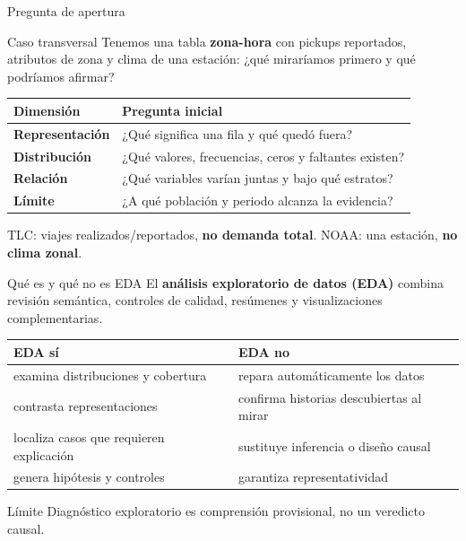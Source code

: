 \documentclass[aspectratio=169,11pt]{beamer}
\newcommand{\concepto}[1]{\textcolor{UAPTeal}{\textbf{#1}}}
\begin{document}
\begin{frame}{Pregunta de apertura}
  \small
  \begin{alertblock}{Caso transversal}
    Tenemos una tabla \textbf{zona-hora} con pickups reportados, atributos de zona y clima de una estación: ¿qué miraríamos primero y qué podríamos afirmar?
  \end{alertblock}
  \begin{tabularx}{\textwidth}{>{\bfseries}p{} X}
    \toprule
    Dimensión & Pregunta inicial \\
    \midrule
    Representación & ¿Qué significa una fila y qué quedó fuera? \\
    Distribución & ¿Qué valores, frecuencias, ceros y faltantes existen? \\
    Relación & ¿Qué variables varían juntas y bajo qué estratos? \\
    Límite & ¿A qué población y periodo alcanza la evidencia? \\
    \bottomrule
  \end{tabularx}
  \vfill
  \centering TLC: viajes realizados/reportados, \textbf{no demanda total}. NOAA: una estación, \textbf{no clima zonal}.
\end{frame}

\begin{frame}{Qué es y qué no es EDA}
  \small
  El \concepto{análisis exploratorio de datos (EDA)} combina revisión semántica, controles de calidad, resúmenes y visualizaciones complementarias.
  \vspace{.4em}
  \begin{tabularx}{\textwidth}{X X}
    \toprule
    \textbf{EDA sí} & \textbf{EDA no} \\
    \midrule
    examina distribuciones y cobertura & repara automáticamente los datos \\
    contrasta representaciones & confirma historias descubiertas al mirar \\
    localiza casos que requieren explicación & sustituye inferencia o diseño causal \\
    genera hipótesis y controles & garantiza representatividad \\
    \bottomrule
  \end{tabularx}
  \vfill
  \begin{block}{Límite}
    Diagnóstico exploratorio es comprensión provisional, no un veredicto causal.
  \end{block}
\end{frame}
\end{document}
